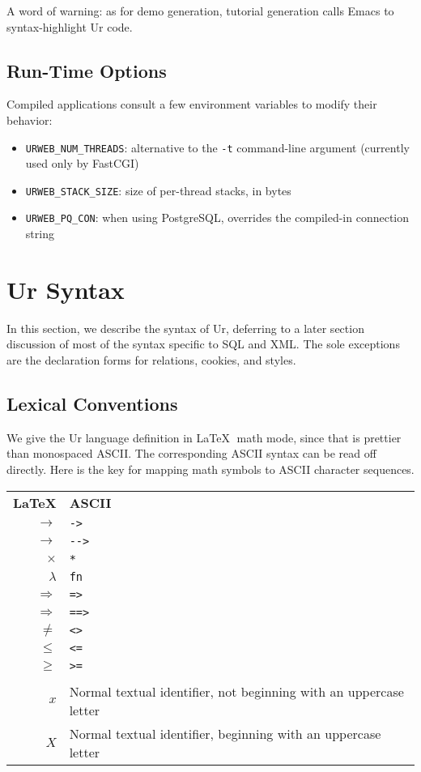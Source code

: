 \documentclass{article}
\newcommand{\cd}[1]{\texttt{#1}}
\begin{document}
A word of warning: as for demo generation, tutorial generation calls Emacs to syntax-highlight Ur code.

\subsection{Run-Time Options}

Compiled applications consult a few environment variables to modify their behavior:

\begin{itemize}
  \item \cd{URWEB\_NUM\_THREADS}: alternative to the \cd{-t} command-line argument (currently used only by FastCGI)
  \item \cd{URWEB\_STACK\_SIZE}: size of per-thread stacks, in bytes
  \item \cd{URWEB\_PQ\_CON}: when using PostgreSQL, overrides the compiled-in connection string
\end{itemize}


\section{Ur Syntax}

In this section, we describe the syntax of Ur, deferring to a later section discussion of most of the syntax specific to SQL and XML.  The sole exceptions are the declaration forms for relations, cookies, and styles.

\subsection{Lexical Conventions}

We give the Ur language definition in \LaTeX $\;$ math mode, since that is prettier than monospaced ASCII.  The corresponding ASCII syntax can be read off directly.  Here is the key for mapping math symbols to ASCII character sequences.

\begin{center}
  \begin{tabular}{rl}
    \textbf{\LaTeX} & \textbf{ASCII} \\
    $\to$ & \cd{->} \\
    $\longrightarrow$ & \cd{-{}->} \\
    $\times$ & \cd{*} \\
    $\lambda$ & \cd{fn} \\
    $\Rightarrow$ & \cd{=>} \\
    $\Longrightarrow$ & \cd{==>} \\
    $\neq$ & \cd{<>} \\
    $\leq$ & \cd{<=} \\
    $\geq$ & \cd{>=} \\
    \\
    $x$ & Normal textual identifier, not beginning with an uppercase letter \\
    $X$ & Normal textual identifier, beginning with an uppercase letter \\
  \end{tabular}
\end{center}
\end{document}
